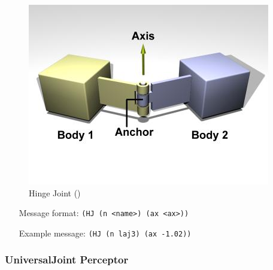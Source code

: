 \begin{figure}[htbp]
  \begin{center}
	\includegraphics[scale=0.6]{fig/HingeJoint.png}
    \caption{Hinge Joint (\cite{ODEManual})}
    \label{ode:hingejoint}
  \end{center}
\end{figure}


\begin{itemize}
	\item[Message format:] \texttt{(HJ (n <name>) (ax <ax>))}
	\item[Example message:] \texttt{(HJ (n laj3) (ax -1.02))}
\end{itemize}

\subsubsection{UniversalJoint Perceptor}
\label{sec:UJP}

